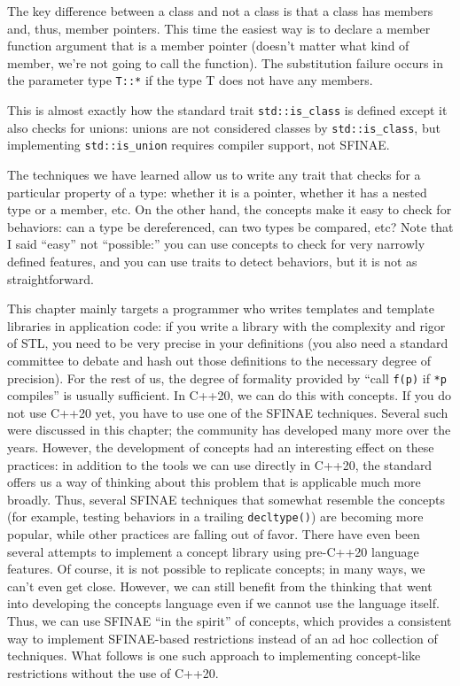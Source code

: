 The key difference between a class and not a class is that a class has members and, thus, member pointers. This time the easiest way is to declare a member function argument that is a member pointer (doesn't matter what kind of member, we're not going to call the function). The substitution failure occurs in the parameter type \texttt{T::*} if the type T does not have any members.

This is almost exactly how the standard trait \texttt{std::is\_class} is defined except it also checks for unions: unions are not considered classes by \texttt{std::is\_class}, but implementing \texttt{std::is\_union} requires compiler support, not SFINAE.

The techniques we have learned allow us to write any trait that checks for a particular property of a type: whether it is a pointer, whether it has a nested type or a member, etc. On the other hand, the concepts make it easy to check for behaviors: can a type be dereferenced, can two types be compared, etc? Note that I said ``easy'' not ``possible:'' you can use concepts to check for very narrowly defined features, and you can use traits to detect behaviors, but it is not as straightforward.

This chapter mainly targets a programmer who writes templates and template libraries in application code: if you write a library with the complexity and rigor of STL, you need to be very precise in your definitions (you also need a standard committee to debate and hash out those definitions to the necessary degree of precision). For the rest of us, the degree of formality provided by ``call \texttt{f(p)} if \texttt{*p} compiles'' is usually sufficient. In C++20, we can do this with concepts. If you do not use C++20 yet, you have to use one of the SFINAE techniques. Several such were discussed in this chapter; the community has developed many more over the years. However, the development of concepts had an interesting effect on these practices: in addition to the tools we can use directly in C++20, the standard offers us a way of thinking about this problem that is applicable much more broadly. Thus, several SFINAE techniques that somewhat resemble the concepts (for example, testing behaviors in a trailing \texttt{decltype()}) are becoming more popular, while other practices are falling out of favor. There have even been several attempts to implement a concept library using pre-C++20 language features. Of course, it is not possible to replicate concepts; in many ways, we can't even get close. However, we can still benefit from the thinking that went into developing the concepts language even if we cannot use the language itself. Thus, we can use SFINAE ``in the spirit'' of concepts, which provides a consistent way to implement SFINAE-based restrictions instead of an ad hoc collection of techniques. What follows is one such approach to implementing concept-like restrictions without the use of C++20.

